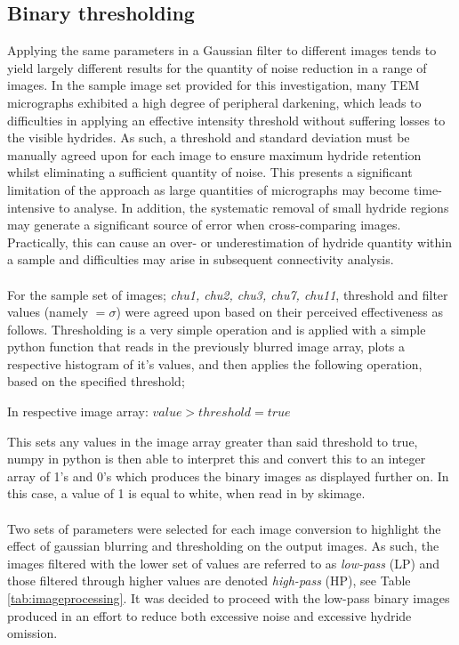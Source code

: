 \documentclass{article}
\begin{document}
	\subsection{Binary thresholding}
	Applying the same parameters in a Gaussian filter to different images tends to yield largely different results for the quantity of noise reduction in a range of images. In the sample image set provided for this investigation, many TEM micrographs exhibited a high degree of peripheral darkening, which leads to difficulties in applying an effective intensity threshold without suffering losses to the visible hydrides. As such, a threshold and standard deviation must be manually agreed upon for each image to ensure maximum hydride retention whilst eliminating a sufficient quantity of noise. This presents a significant limitation of the approach as large quantities of micrographs may become time-intensive to analyse. In addition, the systematic removal of small hydride regions may generate a significant source of error when cross-comparing images. Practically, this can cause an over- or underestimation of hydride quantity within a sample and difficulties may arise in subsequent connectivity analysis.
	\\ 
	\\
	For the sample set of images; \textit{chu1, chu2, chu3, chu7, chu11}, threshold and filter values (namely $=\sigma$) were agreed upon based on their perceived effectiveness as follows. Thresholding is a very simple operation and is applied with a simple python function that reads in the previously blurred image array, plots a respective histogram of it's values, and then applies the following operation, based on the specified threshold;
	\begin{center}
		In respective image array: $ value > threshold = true $
	\end{center}
	This sets any values in the image array greater than said threshold to true, numpy in python is then able to interpret this and convert this to an integer array of 1's and 0's which produces the binary images as displayed further on. In this case, a value of 1 is equal to white, when read in by skimage.
	\\
	\\
	Two sets of parameters were selected for each image conversion to highlight the effect of gaussian blurring and thresholding on the output images. As such, the images filtered with the lower set of values are referred to as \textit{low-pass} (LP) and those filtered through higher values are denoted \textit{high-pass} (HP), see Table \ref{tab:imageprocessing}. It was decided to proceed with the low-pass binary images produced in an effort to reduce both excessive noise and excessive hydride omission.
\end{document}

